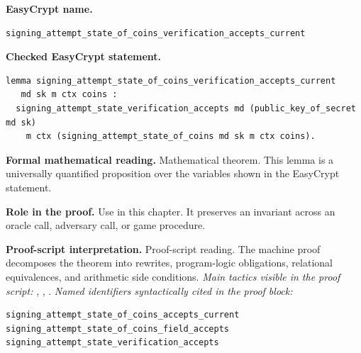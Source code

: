 \begin{formaltheorem}
\noindent\textbf{EasyCrypt name.}
\begin{lstlisting}[language=EasyCrypt,basicstyle=\ttfamily\scriptsize]
signing_attempt_state_of_coins_verification_accepts_current
\end{lstlisting}
\noindent\textbf{Checked EasyCrypt statement.}
\begin{lstlisting}[language=EasyCrypt,basicstyle=\ttfamily\scriptsize]
lemma signing_attempt_state_of_coins_verification_accepts_current
   md sk m ctx coins :
  signing_attempt_state_verification_accepts md (public_key_of_secret md sk)
    m ctx (signing_attempt_state_of_coins md sk m ctx coins).
\end{lstlisting}
\noindent\textbf{Formal mathematical reading.}
Mathematical theorem. This lemma is a universally quantified proposition over the variables shown in the EasyCrypt statement.

\noindent\textbf{Role in the proof.}
Use in this chapter. It preserves an invariant across an oracle call, adversary call, or game procedure.

\noindent\textbf{Proof-script interpretation.}
Proof-script reading. The machine proof decomposes the theorem into rewrites, program-logic obligations, relational equivalences, and arithmetic side conditions.
\emph{Main tactics visible in the proof script:} , , .
\emph{Named identifiers syntactically cited in the proof block:}
\begin{lstlisting}[language=EasyCrypt,basicstyle=\ttfamily\scriptsize]
signing_attempt_state_of_coins_accepts_current
signing_attempt_state_of_coins_field_accepts
signing_attempt_state_verification_accepts
\end{lstlisting}

\end{formaltheorem}

